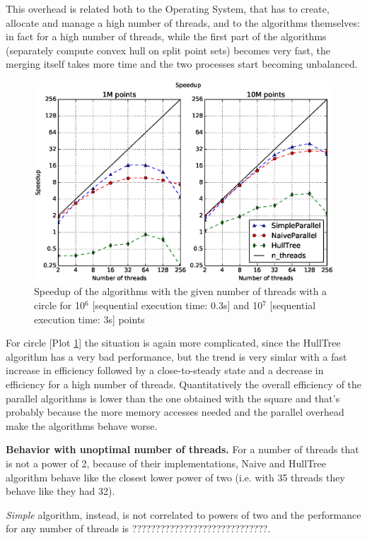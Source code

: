 \documentclass[letterpaper]{article}
\newcommand{\mypar}[1]{{\bf #1.}}
\theoremstyle{definition}
\begin{document}
This overhead is related both to the Operating System, that has to create, allocate and manage a high number of threads, and to the algorithms themselves:
in fact for a high number of threads, while the first part of the algorithms (separately compute convex hull on split point sets) becomes very fast, the merging itself takes more time and the two processes start becoming unbalanced.

\begin{figure}[!ht]\centering
  \includegraphics[scale=0.33]{./plots/speedup_xeon_circle_fixed_points.eps}
  \caption{Speedup of the algorithms with the given number of threads with a circle for 10$^6$ [sequential execution time: 0.3s] and 10$^7$ [sequential execution time: 3s] points\label{Threads speedup circle}}
\end{figure}

For circle [Plot \ref{Threads speedup circle}] the situation is again more complicated, since the HullTree algorithm has a very bad performance, but the trend is very simlar with a fast increase in efficiency followed by a close-to-steady state and a decrease in efficiency for a high number of threads.
Quantitatively the overall efficiency of the parallel algorithms is lower than the one obtained with the square and that's probably because the more memory accesses needed and the parallel overhead make the algorithms behave worse.

\mypar{Behavior with unoptimal number of threads}
For a number of threads that is not a power of 2, because of their implementations, Naive and HullTree algorithm behave like the closest lower power of two (i.e. with 35 threads they behave like they had 32).

\textit{Simple} algorithm, instead, is not correlated to powers of two and the performance for any number of threads is ?????????????????????????????.
\end{document}
